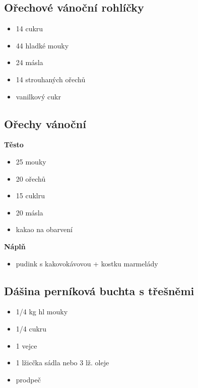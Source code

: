 \documentclass[10pt,a4paper]{article}
\newenvironment{myitemize}
{ \begin{itemize}
    \setlength{\itemsep}{0pt}
    \setlength{\parskip}{0pt}
    \setlength{\parsep}{0pt}     }
{ \end{itemize}                  }
\begin{document}
\subsection{Ořechové vánoční rohlíčky}
\begin{minipage}[t]{0,5\textwidth}
\begin{myitemize} 
\item 14 cukru
\item 44 hladké mouky
\item 24 másla
\item 14 strouhaných ořechů
\item vanilkový cukr
\end{myitemize}
\end{minipage}
\begin{minipage}[t]{0,5\textwidth}

\end{minipage}
\subsection{Ořechy vánoční}
\begin{minipage}[t]{0,5\textwidth}
\textbf{Těsto}
\begin{myitemize} 
\item 25 mouky
\item 20 ořechů
\item 15 cuklru
\item 20 másla
\item kakao na obarvení
\end{myitemize}
\end{minipage}
\begin{minipage}[t]{0,5\textwidth}
\textbf{Náplň}
\begin{myitemize} 
\item pudink s kakovokávovou + kostku marmelády
\end{myitemize}
\end{minipage}
\subsection{Dášina perníková buchta s třešněmi}
\begin{minipage}[t]{0,5\textwidth}
\begin{myitemize} 
\item 1/4 kg hl mouky
\item 1/4 cukru
\item 1 vejce
\item 1 lžicčka sádla nebo 3 lž. oleje
\item prodpeč
\end{myitemize}
\end{minipage}
\begin{minipage}[t]{0,5\textwidth}

\end{minipage}
\end{document}
